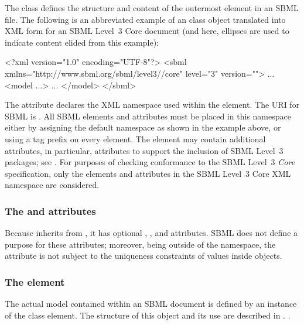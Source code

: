 The \SBML class defines the structure and content of the
 outermost element in an SBML file.  The following is
an abbreviated example of an \SBML class object translated into
XML form for an SBML Level~3  Core document (and here,
ellipses  are used to indicate content elided from this example):

\begin{example}
<?xml version="1.0" encoding="UTF-8"?>
<sbml xmlns="http://www.sbml.org/sbml/level3//core" level="3" version="">
  ...
  <model ...>
     ...
  </model>
</sbml>
\end{example}

The attribute  declares the XML namespace used within
the  element.  The URI for SBML \thisLV is
.  All SBML
\thisLV elements and attributes must be placed in this namespace
either by assigning the default namespace as shown in the example
above, or using a tag prefix on every element.  The 
element may contain additional attributes, in particular,
attributes to support the inclusion of SBML Level~3 packages; see
.  For purposes of checking
conformance to the SBML Level~3 \emph{Core} specification, only
the elements and attributes in the SBML Level~3 Core XML namespace
are considered.


\begin{blockChanged}
\subsubsection{The  and  attributes}

Because \SBML inherits from \SBase, it has optional , ,  and  attributes.  SBML \thisLVNC does not define a purpose for these attributes; moreover, being outside of the \Model namespace, the  attribute is not subject to the uniqueness constraints of  values inside \Model objects.

\end{blockChanged}


\subsubsection{The  element}

The actual model contained within an SBML document is defined by
an instance of the \Model class element.  The structure of this
object and its use are described in .
.


